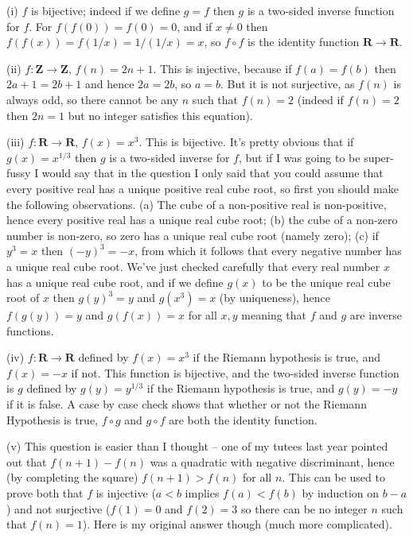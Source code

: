 \documentclass[10pt]{article}
\newcommand{\R}{\mathbf{R}}
\newcommand{\Z}{\mathbf{Z}}
\begin{document}
\medskip{} 

(i) $f$ is bijective; indeed if we define $g=f$ then $g$ is a two-sided inverse function for $f$. For $f(f(0))=f(0)=0$, and if $x\not=0$ then $f(f(x))=f(1/x)=1/(1/x)=x$, so $f\circ f$ is the identity function $\R\to\R$.

(ii) $f:\Z\to\Z$, $f(n)=2n+1$. This is injective, because if $f(a)=f(b)$ then $2a+1=2b+1$ and hence $2a=2b$, so $a=b$. But it is not surjective, as $f(n)$ is always odd, so there cannot be any $n$ such that $f(n)=2$ (indeed if $f(n)=2$ then $2n=1$ but no integer satisfies this equation). 

(iii) $f:\R\to\R$, $f(x)=x^3$. This is bijective. It's pretty obvious that if $g(x)=x^{1/3}$ then $g$ is a two-sided inverse for $f$, but if I was going to be super-fussy I would say that in the question I only said that you could assume that every positive real has a unique positive real cube root, so first you should make the following observations. (a) The cube of a non-positive real is non-positive, hence every positive real has a unique real cube root; (b) the cube of a non-zero number is non-zero, so zero has a unique real cube root (namely zero); (c) if $y^3=x$ then $(-y)^3=-x$, from which it follows that every negative number has a unique real cube root. We've just checked carefully that every real number $x$ has a unique real cube root, and if we define $g(x)$ to be the unique real cube root of $x$ then $g(y)^3=y$ and $g(x^3)=x$ (by uniqueness), hence $f(g(y))=y$ and $g(f(x))=x$ for all $x,y$ meaning that $f$ and $g$ are inverse functions.

(iv) $f:\R\to\R$ defined by $f(x)=x^3$ if the Riemann hypothesis is true, and $f(x)=-x$ if not. This function is bijective, and the two-sided inverse function is $g$ defined by $g(y)=y^{1/3}$ if the Riemann hypothesis is true, and $g(y)=-y$ if it is false. A case by case check shows that whether or not the Riemann Hypothesis is true, $f\circ g$ and $g\circ f$ are both the identity function.

(v) This question is easier than I thought -- one of my tutees last year pointed out that $f(n+1)-f(n)$ was a quadratic with negative discriminant, hence (by completing the square) $f(n+1)>f(n)$ for all $n$. This can be used to prove both that $f$ is injective ($a<b$ implies $f(a)<f(b)$ by induction on $b-a$) and not surjective ($f(1)=0$ and $f(2)=3$ so there can be no integer $n$ such that $f(n)=1$). Here is my original answer though (much more complicated).
\end{document}
